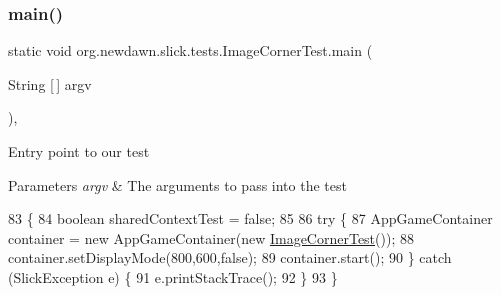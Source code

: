 \mbox{\label{classorg_1_1newdawn_1_1slick_1_1tests_1_1_image_corner_test_a7d9fa44ac7909af63a91c21cadd48c62}} 
\subsubsection{\texorpdfstring{main()}{main()}}
{\footnotesize\ttfamily static void org.\+newdawn.\+slick.\+tests.\+Image\+Corner\+Test.\+main (\begin{DoxyParamCaption}\item[{String \mbox{[}$\,$\mbox{]}}]{argv }\end{DoxyParamCaption})\hspace{0.3cm}{\ttfamily [inline]}, {\ttfamily [static]}}

Entry point to our test


\begin{DoxyParams}{Parameters}
{\em argv} & The arguments to pass into the test \\
\hline
\end{DoxyParams}

\begin{DoxyCode}
83                                            \{
84         \textcolor{keywordtype}{boolean} sharedContextTest = \textcolor{keyword}{false};
85         
86         \textcolor{keywordflow}{try} \{
87             AppGameContainer container = \textcolor{keyword}{new} AppGameContainer(\textcolor{keyword}{new} 
      \mbox{\hyperlink{classorg_1_1newdawn_1_1slick_1_1tests_1_1_image_corner_test_ade0380ea229639b40e852dd729408be7}{ImageCornerTest}}());
88             container.setDisplayMode(800,600,\textcolor{keyword}{false});
89             container.start();
90         \} \textcolor{keywordflow}{catch} (SlickException e) \{
91             e.printStackTrace();
92         \}
93     \}
\end{DoxyCode}
\mbox{\label{classorg_1_1newdawn_1_1slick_1_1tests_1_1_image_corner_test_ad1386a068201a52f4052d68dbd411689}} 
